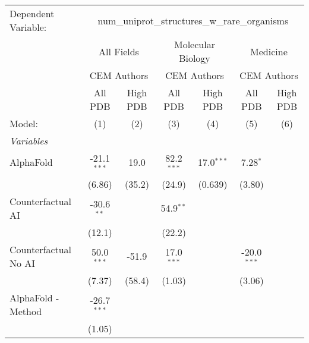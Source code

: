 \begingroup
\centering
\begin{tabular}{lcccccc}
   \tabularnewline \midrule \midrule
   Dependent Variable: & \multicolumn{6}{c}{num\_uniprot\_structures\_w\_rare\_organisms}\\
 & \multicolumn{2}{c}{All Fields} & \multicolumn{2}{c}{Molecular Biology} & \multicolumn{2}{c}{Medicine} \\
\cmidrule(lr){2-3} \cmidrule(lr){4-5} \cmidrule(lr){6-7}
 & \multicolumn{2}{c}{CEM Authors} & \multicolumn{2}{c}{CEM Authors} & \multicolumn{2}{c}{CEM Authors} \\
\cmidrule(lr){2-3} \cmidrule(lr){4-5} \cmidrule(lr){6-7}
 & \multicolumn{1}{c}{All PDB} & \multicolumn{1}{c}{High PDB} & \multicolumn{1}{c}{All PDB} & \multicolumn{1}{c}{High PDB} & \multicolumn{1}{c}{All PDB} & \multicolumn{1}{c}{High PDB} \\
\cmidrule(lr){2-2} \cmidrule(lr){3-3} \cmidrule(lr){4-4} \cmidrule(lr){5-5} \cmidrule(lr){6-6} \cmidrule(lr){7-7}
   Model:                                                     & (1)           & (2)    & (3)          & (4)          & (5)           & (6)\\  
   \midrule
   \emph{Variables}\\
   AlphaFold                                                  & -21.1$^{***}$ & 19.0   & 82.2$^{***}$ & 17.0$^{***}$ & 7.28$^{*}$    &   \\   
                                                              & (6.86)        & (35.2) & (24.9)       & (0.639)      & (3.80)        &   \\   
   Counterfactual AI                                          & -30.6$^{**}$  &        & 54.9$^{**}$  &              &               &   \\   
                                                              & (12.1)        &        & (22.2)       &              &               &   \\   
   Counterfactual No AI                                       & 50.0$^{***}$  & -51.9  & 17.0$^{***}$ &              & -20.0$^{***}$ &   \\   
                                                              & (7.37)        & (58.4) & (1.03)       &              & (3.06)        &   \\   
   AlphaFold - Method                                         & -26.7$^{***}$ &        &              &              &               &   \\   
                                                              & (1.05)        &        &              &              &               &   \\   

\end{tabular}
